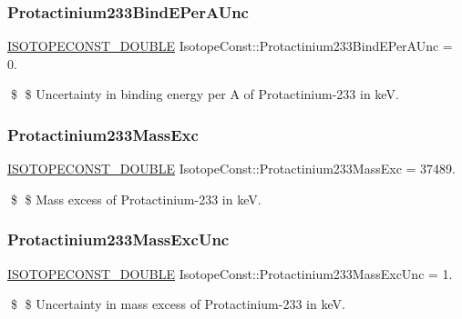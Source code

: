 \subsubsection{\texorpdfstring{Protactinium233\+Bind\+E\+Per\+A\+Unc}{Protactinium233BindEPerAUnc}}
{\footnotesize\ttfamily \mbox{\hyperlink{group___isotope_const-_macros_ga8f45a7272ce02c0b4c65c44636ed719a}{I\+S\+O\+T\+O\+P\+E\+C\+O\+N\+S\+T\+\_\+\+D\+O\+U\+B\+LE}} Isotope\+Const\+::\+Protactinium233\+Bind\+E\+Per\+A\+Unc = 0.}

\$ \$ Uncertainty in binding energy per A of Protactinium-\/233 in keV. \mbox{\label{group___isotope_const-_protactinium-_pa233_gab168b6e6d94de212c546aee4f93c2f57}} 
\subsubsection{\texorpdfstring{Protactinium233\+Mass\+Exc}{Protactinium233MassExc}}
{\footnotesize\ttfamily \mbox{\hyperlink{group___isotope_const-_macros_ga8f45a7272ce02c0b4c65c44636ed719a}{I\+S\+O\+T\+O\+P\+E\+C\+O\+N\+S\+T\+\_\+\+D\+O\+U\+B\+LE}} Isotope\+Const\+::\+Protactinium233\+Mass\+Exc = 37489.}

\$ \$ Mass excess of Protactinium-\/233 in keV. \mbox{\label{group___isotope_const-_protactinium-_pa233_gab8185b65672def55fa8daf3478d5b9ee}} 
\subsubsection{\texorpdfstring{Protactinium233\+Mass\+Exc\+Unc}{Protactinium233MassExcUnc}}
{\footnotesize\ttfamily \mbox{\hyperlink{group___isotope_const-_macros_ga8f45a7272ce02c0b4c65c44636ed719a}{I\+S\+O\+T\+O\+P\+E\+C\+O\+N\+S\+T\+\_\+\+D\+O\+U\+B\+LE}} Isotope\+Const\+::\+Protactinium233\+Mass\+Exc\+Unc = 1.}

\$ \$ Uncertainty in mass excess of Protactinium-\/233 in keV. \mbox{\label{group___isotope_const-_protactinium-_pa233_ga020b98acaa71450b29d8c4b69a46c08a}} 
